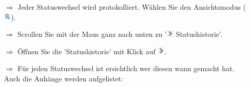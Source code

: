 \documentclass{article}
\begin{document}
\begin{multicols}{2}
\begin{tcolorbox}[colback=blue!5,colframe=blue!40!black,title=Statushistorie]
\begin{itemize}
  \item[$\Longrightarrow$] Jeder Statuswechsel wird protokolliert. Wählen Sie den Ansichtsmodus (\includegraphics[height=10pt]{Icons/Lupe.jpg}).
  \item[$\Longrightarrow$] Scrollen Sie mit der Maus ganz nach unten zu '\includegraphics[height=10pt]{Icons/Pfeil_rechts_g.jpg} Statushistorie'.
  \item[$\Longrightarrow$] Öffnen Sie die 'Statushistorie' mit Klick auf \includegraphics[height=10pt]{Icons/Pfeil_rechts_g.jpg}.
  \item[$\Longrightarrow$] Für jeden Statuswechsel ist ersichtlich wer diesen wann gemacht hat. Auch die Anhänge werden aufgelistet:
\end{itemize}

\begin{centering}
\end{centering}

\end{tcolorbox}


\end{multicols}



\vspace{\baselineskip}


\vspace{\baselineskip}
\end{document}
